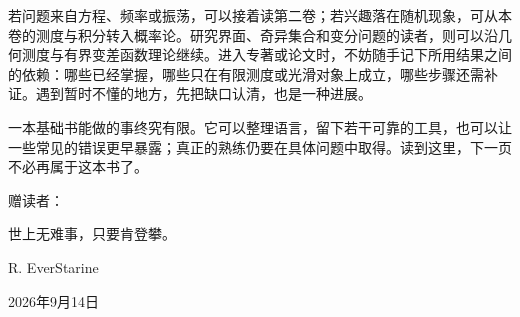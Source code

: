 \ProseParagraphBreak

若问题来自方程、频率或振荡，可以接着读第二卷；若兴趣落在随机现象，可从本卷的测度与积分转入概率论。研究界面、奇异集合和变分问题的读者，则可以沿几何测度与有界变差函数理论继续。进入专著或论文时，不妨随手记下所用结果之间的依赖：哪些已经掌握，哪些只在有限测度或光滑对象上成立，哪些步骤还需补证。遇到暂时不懂的地方，先把缺口认清，也是一种进展。

\ProseParagraphBreak

一本基础书能做的事终究有限。它可以整理语言，留下若干可靠的工具，也可以让一些常见的错误更早暴露；真正的熟练仍要在具体问题中取得。读到这里，下一页不必再属于这本书了。

\ProseParagraphBreak

赠读者：

\begin{poemquote}
世上无难事，只要肯登攀。
\end{poemquote}

\bigskip

\begin{flushright}
    R. EverStarine

    2026年9月14日
\end{flushright}
